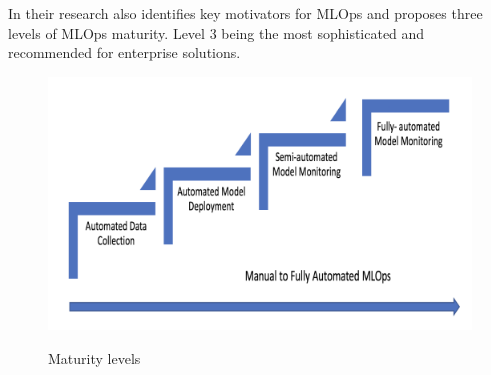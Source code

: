 In their research\cite{inproceedings} also identifies key motivators for MLOps and proposes three levels of MLOps maturity.
Level 3 being the most sophisticated and recommended for enterprise solutions.

\begin{figure}[!htbp]
    \caption{Maturity levels \cite{mlops-maturity-model}}
    \centering
    \includegraphics[scale=0.5]{images/maturity-levels}
    \label{fig:maturity}
\end{figure}


